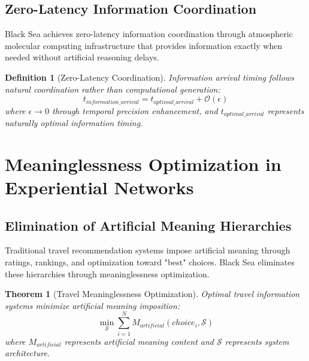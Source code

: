 \documentclass[12pt,a4paper]{article}
\newtheorem{theorem}{Theorem}
\newtheorem{definition}{Definition}
\begin{document}
\subsection{Zero-Latency Information Coordination}

Black Sea achieves zero-latency information coordination through atmospheric molecular computing infrastructure that provides information exactly when needed without artificial reasoning delays.

\begin{definition}[Zero-Latency Coordination]
Information arrival timing follows natural coordination rather than computational generation:
\begin{equation}
t_{information\_arrival} = t_{optimal\_arrival} + \mathcal{O}(\epsilon)
\end{equation}
where $\epsilon \rightarrow 0$ through temporal precision enhancement, and $t_{optimal\_arrival}$ represents naturally optimal information timing.
\end{definition}

\section{Meaninglessness Optimization in Experiential Networks}

\subsection{Elimination of Artificial Meaning Hierarchies}

Traditional travel recommendation systems impose artificial meaning through ratings, rankings, and optimization toward "best" choices. Black Sea eliminates these hierarchies through meaninglessness optimization.

\begin{theorem}[Travel Meaninglessness Optimization]
Optimal travel information systems minimize artificial meaning imposition:
\begin{equation}
\min_{\mathcal{S}} \sum_{i=1}^N M_{artificial}(choice_i, \mathcal{S})
\end{equation}
where $M_{artificial}$ represents artificial meaning content and $\mathcal{S}$ represents system architecture.
\end{theorem}
\end{document}
